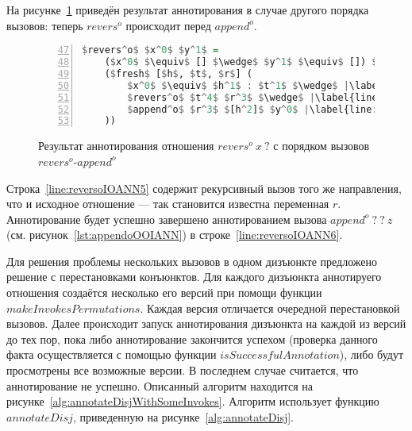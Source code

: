 На рисунке~\ref{lst:reversoIOANN} приведён результат аннотирования в случае другого порядка вызовов: теперь $revers^o$ происходит перед $append^o$.

\begin{figure}[h!]
  \begin{center}
  \begin{minipage}{0.4\textwidth}
  \begin{lstlisting}[language=Haskell, frame=single, numbers=left,numberstyle=\small, firstnumber=47, escapechar=|]
  $revers^o$ $x^0$ $y^1$ =
    ($x^0$ $\equiv$ [] $\wedge$ $y^1$ $\equiv$ []) $\vee$ |\label{line:reversoIOANN2}|
    ($fresh$ [$h$, $t$, $r$] (
        $x^0$ $\equiv$ $h^1$ : $t^1$ $\wedge$ |\label{line:reversoIOANN4}|
        $revers^o$ $t^4$ $r^3$ $\wedge$ |\label{line:reversoIOANN5}|
        $append^o$ $r^3$ $[h^2]$ $y^0$ |\label{line:reversoIOANN6}|
    ))
    \end{lstlisting}
  \end{minipage}
  \end{center}
  \caption{Результат аннотирования отношения $revers^o \ x \ ?$ с порядком вызовов $revers^o$-$append^o$}
  \label{lst:reversoIOANN}
\end{figure}

Строка~\ref{line:reversoIOANN5} содержит рекурсивный вызов того же направления, что и исходное отношение --- так становится известна переменная $r$.
Аннотирование будет успешно завершено аннотированием вызова $append^o \ ? \ ? \ z$ (см. рисунок~\ref{lst:appendoOOIANN}) в строке~\ref{line:reversoIOANN6}.

Для решения проблемы нескольких вызовов в одном дизъюнкте предложено решение с перестановками конъюнктов.
Для каждого дизъюнкта аннотируего отношения создаётся несколько его версий при помощи функции $makeInvokesPermutations$.
Каждая версия отличается очередной перестановкой вызовов.
Далее происходит запуск аннотирования дизъюнкта на каждой из версий до тех пор, пока либо аннотирование закончится успехом (проверка данного факта осуществляется с помощью функции $isSuccessfulAnnotation$), либо будут просмотрены все возможные версии.
В последнем случае считается, что аннотирование не успешно.
Описанный алгоритм находится на рисунке~\ref{alg:annotateDisjWithSomeInvokes}.
Алгоритм использует функцию $annotateDisj$, приведенную на рисунке~\ref{alg:annotateDisj}.

